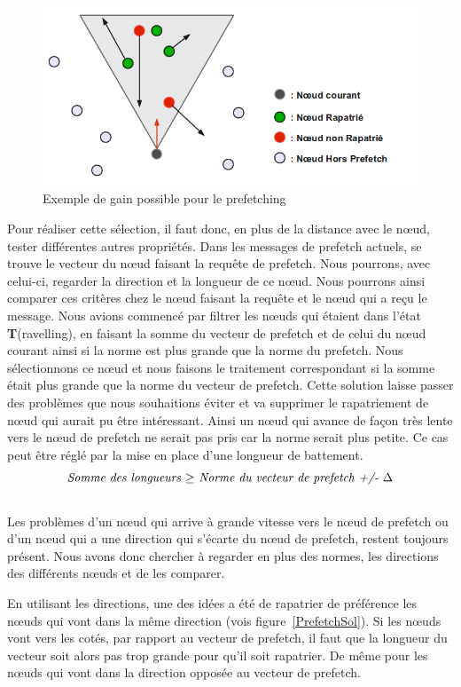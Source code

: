 	\begin{figure}[!h]
        \centering
        \includegraphics[scale=0.45]{./Ressources/Images/prefetchaV1.png}
        \caption{Exemple de gain possible pour le prefetching}
        \label{prefetchav}
        \end{figure}

\par Pour réaliser cette sélection, il faut donc, en plus de la distance avec le nœud, tester différentes autres propriétés. Dans les messages de prefetch actuels, se trouve le vecteur du nœud faisant la requête de prefetch. Nous pourrons, avec celui-ci, regarder la direction et la longueur de ce nœud. Nous pourrons ainsi comparer ces critères chez le nœud faisant la requête et le nœud qui a reçu le message. Nous avions commencé par filtrer les nœuds qui étaient dans l'état \textbf{T}(ravelling), en faisant la somme du vecteur de prefetch et de celui du nœud courant ainsi si la norme est plus grande que la norme du prefetch. Nous sélectionnons ce nœud et nous faisons le traitement correspondant si la somme était plus grande que la norme du vecteur de prefetch. Cette solution laisse passer des problèmes que nous souhaitions éviter et va supprimer le rapatriement de nœud qui aurait pu être intéressant. Ainsi un nœud qui avance de façon très lente vers le nœud de prefetch ne serait pas pris car la norme serait plus petite. Ce cas peut être réglé par la mise en place d'une longueur de battement.
\newline
$$\\\textit{Somme des longueurs~$\ge$~Norme du vecteur de prefetch +/- $\Delta$}$$
\\Les problèmes d'un nœud qui arrive à grande vitesse vers le nœud de prefetch ou d'un nœud qui a une direction qui s'écarte du nœud de prefetch, restent toujours présent. Nous avons donc chercher à regarder en plus des normes, les directions des différents nœuds et de les comparer.
\par En utilisant les directions, une des idées a été de rapatrier de préférence les nœuds qui vont dans la même direction (vois figure~\ref{PrefetchSol}). Si les nœuds vont vers les cotés, par rapport au vecteur de prefetch, il faut que la longueur du vecteur soit alors pas trop grande pour qu'il soit rapatrier. De même pour les nœuds qui vont dans la direction opposée au vecteur de prefetch.

